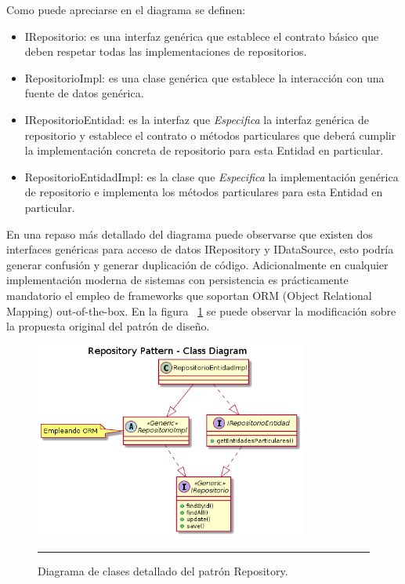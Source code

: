 Como puede apreciarse en el diagrama se definen:
\begin{itemize}
	\item IRepositorio: es una interfaz genérica que establece el contrato básico que deben respetar todas las implementaciones de repositorios.
	\item RepositorioImpl: es una clase genérica que establece la interacción con una fuente de datos genérica.
	\item IRepositorioEntidad: es la interfaz que \textit{Especifica} la interfaz genérica de repositorio y establece el contrato o métodos particulares que deberá cumplir la implementación concreta de repositorio para esta Entidad en particular.
	\item RepositorioEntidadImpl: es la clase que \textit{Especifica} la implementación genérica de repositorio e implementa los métodos particulares para esta Entidad en particular.
\end{itemize}

En una repaso más detallado del diagrama puede observarse que existen dos interfaces genéricas para acceso de datos IRepository y IDataSource, esto podría generar confusión y generar duplicación de código. Adicionalmente en cualquier implementación moderna de sistemas con persistencia es prácticamente mandatorio el empleo de frameworks que soportan ORM (Object Relational Mapping) out-of-the-box.
En la figura ~\ref{fig:uml_clases_detalles_repository} se puede observar la modificación sobre la propuesta original del patrón de diseño.

\begin{figure}[htbp]
	\centering
	\includegraphics[width=0.8\textwidth]{Figures/uml_clases_nodatasources_repository.png}
	\rule{35em}{1pt}
	\caption[Repository Pattern Detailed Class Diagram]{Diagrama de clases detallado del patrón Repository.}
	\label{fig:uml_clases_detalles_repository}
\end{figure}

